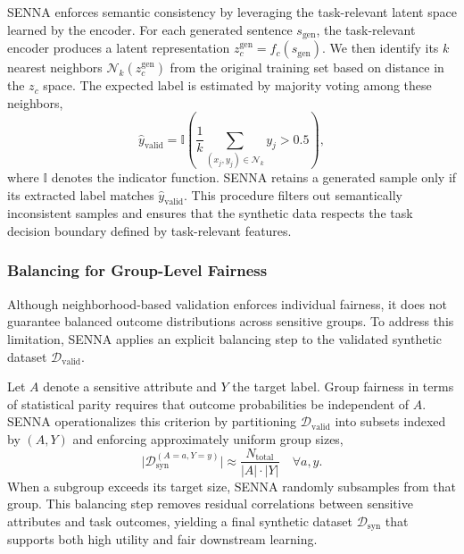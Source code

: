 \documentclass[runningheads]{llncs}
\begin{document}
SENNA enforces semantic consistency by leveraging the task-relevant latent space learned by the
encoder.
For each generated sentence $s_{\mathrm{gen}}$, the task-relevant encoder produces a latent
representation $z_c^{\mathrm{gen}} = f_c(s_{\mathrm{gen}})$.
We then identify its $k$ nearest neighbors $\mathcal{N}_k(z_c^{\mathrm{gen}})$ from the original
training set based on distance in the $z_c$ space.
The expected label is estimated by majority voting among these neighbors,
\begin{equation}
\hat{y}_{\mathrm{valid}} =
\mathbb{I}\!\left(\frac{1}{k}\sum_{(x_j,y_j)\in\mathcal{N}_k} y_j > 0.5\right),
\end{equation}
where $\mathbb{I}$ denotes the indicator function.
SENNA retains a generated sample only if its extracted label matches $\hat{y}_{\mathrm{valid}}$.
This procedure filters out semantically inconsistent samples and ensures that the synthetic data
respects the task decision boundary defined by task-relevant features.

\subsubsection{Balancing for Group-Level Fairness}

Although neighborhood-based validation enforces individual fairness, it does not guarantee
balanced outcome distributions across sensitive groups.
To address this limitation, SENNA applies an explicit balancing step to the validated synthetic
dataset $\mathcal{D}_{\mathrm{valid}}$.

Let $A$ denote a sensitive attribute and $Y$ the target label.
Group fairness in terms of statistical parity requires that outcome probabilities be independent
of $A$.
SENNA operationalizes this criterion by partitioning $\mathcal{D}_{\mathrm{valid}}$ into subsets
indexed by $(A, Y)$ and enforcing approximately uniform group sizes,
\begin{equation}
\lvert \mathcal{D}_{\mathrm{syn}}^{(A=a, Y=y)} \rvert
\approx \frac{N_{\mathrm{total}}}{|A|\cdot|Y|}
\quad \forall a,y.
\end{equation}
When a subgroup exceeds its target size, SENNA randomly subsamples from that group.
This balancing step removes residual correlations between sensitive attributes and task outcomes,
yielding a final synthetic dataset $\mathcal{D}_{\mathrm{syn}}$ that supports both high utility and
fair downstream learning.
\end{document}

